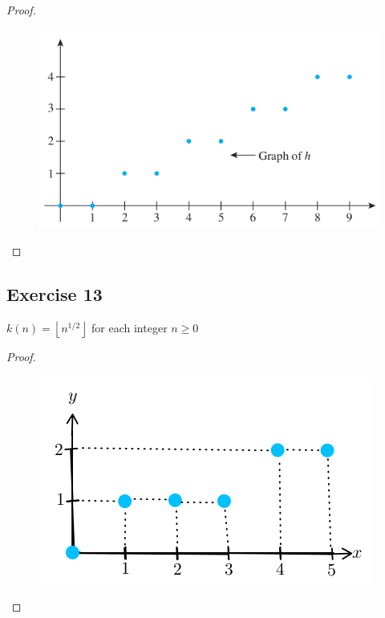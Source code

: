 \documentclass[14pt]{extarticle}
\newcommand{\floor}[1]{{\left\lfloor#1\right\rfloor}}
\begin{document}
\begin{proof}
    \begin{figure}[ht!]
        \centering
        \includegraphics[scale=0.5]{../images/11.1.12.png}
    \end{figure}
\end{proof}

\subsection{Exercise 13}
\(k(n) = \floor{n^{1/2}}\) for each integer \(n \geq 0\)

\begin{proof}
    \begin{figure}[ht!]
        \centering
        \includegraphics[scale=0.5]{../images/11.1.13.png}
    \end{figure}
\end{proof}
\end{document}
